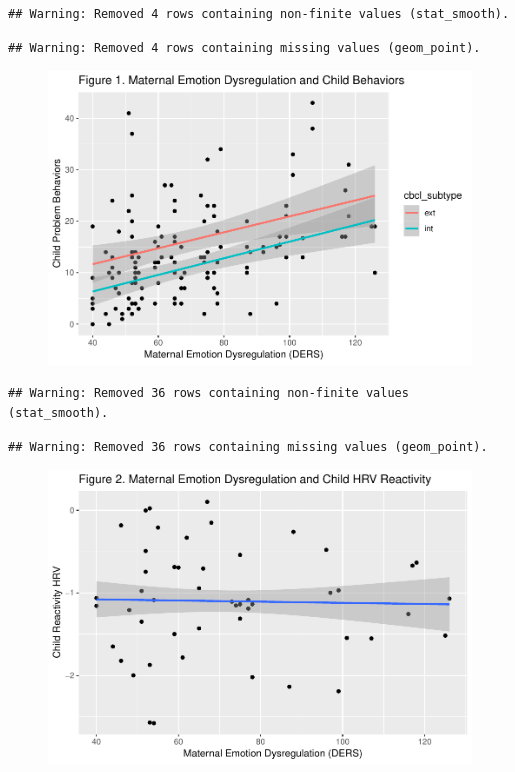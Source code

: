 \documentclass[man]{apa6}
\begin{document}
\begin{verbatim}
## Warning: Removed 4 rows containing non-finite values (stat_smooth).
\end{verbatim}

\begin{verbatim}
## Warning: Removed 4 rows containing missing values (geom_point).
\end{verbatim}

\begin{figure}
\centering
\includegraphics{DataPrepScript_apa_style_files/figure-latex/plots-1.pdf}
\caption{}
\end{figure}

\begin{verbatim}
## Warning: Removed 36 rows containing non-finite values (stat_smooth).
\end{verbatim}

\begin{verbatim}
## Warning: Removed 36 rows containing missing values (geom_point).
\end{verbatim}

\begin{figure}
\centering
\includegraphics{DataPrepScript_apa_style_files/figure-latex/plots-2.pdf}
\caption{}
\end{figure}
\end{document}
